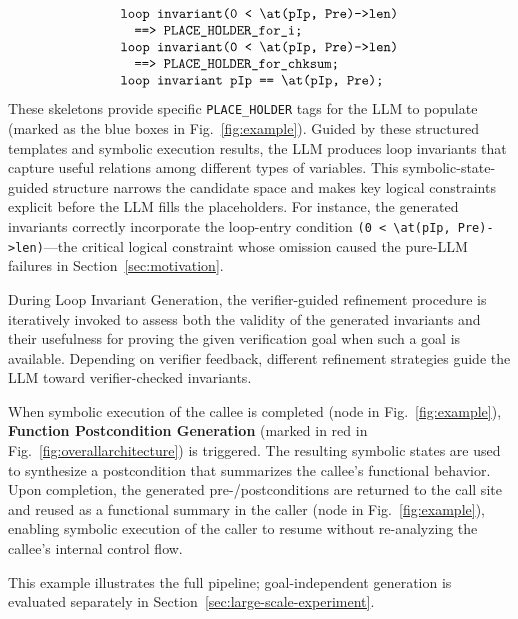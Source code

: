 {
\footnotesize
\[
\begin{array}{@{}l@{}}

  \texttt{loop invariant} \texttt{(0 < \textbackslash at(pIp, Pre)->len)} \\
  \quad \texttt{==> PLACE\_HOLDER\_for\_i;} \\
  \texttt{loop invariant} \texttt{(0 < \textbackslash at(pIp, Pre)->len)} \\
  \quad \texttt{==> PLACE\_HOLDER\_for\_chksum;} \\
  \texttt{loop invariant pIp == \textbackslash at(pIp, Pre);}

\end{array}
\]
}
These skeletons provide specific \texttt{PLACE\_HOLDER} tags for the LLM to populate (marked as the blue boxes in Fig.~\ref{fig:example}). Guided by these structured templates and symbolic execution results,
the LLM produces loop invariants that capture useful relations among different types of variables. This symbolic-state-guided structure narrows the candidate space and makes key logical constraints explicit before the LLM fills the placeholders. For instance, the generated invariants correctly incorporate the loop-entry condition \texttt{(0 < \textbackslash at(pIp, Pre)->len)}---the critical logical constraint whose omission caused the pure-LLM failures in Section~\ref{sec:motivation}.

\DIFaddbegin
During Loop Invariant Generation, the verifier-guided refinement procedure is iteratively invoked to assess both the validity of the generated invariants and their usefulness for proving the given verification goal when such a goal is available. Depending on verifier feedback, different refinement strategies guide the LLM toward verifier-checked invariants. 
\DIFaddend

When symbolic execution of the callee is completed (node  in Fig.~\ref{fig:example}), \textbf{Function Postcondition Generation} (marked in red in Fig.~\ref{fig:overallarchitecture}) is triggered. The resulting symbolic states are used to synthesize a postcondition that summarizes the callee's functional behavior. Upon completion, the generated pre-/postconditions are returned to the call site and reused as a functional summary in the caller (node  in Fig.~\ref{fig:example}), enabling symbolic execution of the caller to resume without re-analyzing the callee's internal control flow. 







\DIFaddbegin
This example illustrates the full pipeline; goal-independent generation is evaluated separately in Section~\ref{sec:large-scale-experiment}.
\DIFaddend

